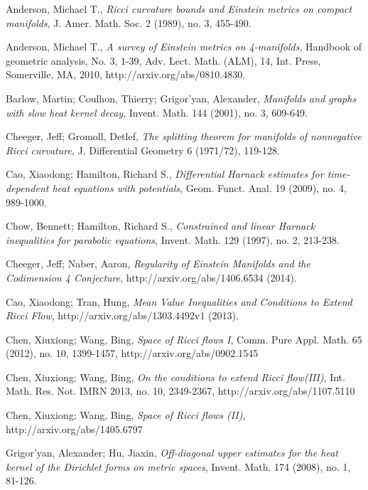 \documentclass[11pt]{amsart}
\numberwithin{equation}{section}
\numberwithin{equation}{section}
\begin{document}
\begin{thebibliography}{00000}
 Anderson, Michael T., {\it Ricci curvature bounds and Einstein metrics on compact manifolds}, J. Amer. Math. Soc. 2 (1989), no. 3, 455-490. 

 Anderson, Michael T., {\it A survey of Einstein metrics on 4-manifolds}, Handbook of geometric analysis, No. 3, 1-39, Adv. Lect. Math. (ALM), 14, Int. Press, Somerville, MA, 2010, http://arxiv.org/abs/0810.4830. 

 Barlow, Martin; Coulhon, Thierry; Grigor'yan, Alexander,
{\it Manifolds and graphs with slow heat kernel decay}, Invent. Math. 144 (2001), no. 3, 609-649.

 Cheeger, Jeff; Gromoll, Detlef,
{\it The splitting theorem for manifolds of nonnegative Ricci curvature}, 
J. Differential Geometry 6 (1971/72), 119-128. 

 Cao, Xiaodong; Hamilton, Richard S., {\it Differential Harnack estimates for time-dependent heat equations with potentials},  Geom. Funct. Anal. 19 (2009), no. 4, 989-1000.

 Chow, Bennett; Hamilton, Richard S., {\it Constrained and linear Harnack inequalities for parabolic equations}, Invent. Math. 129 (1997), no. 2, 213-238.

 Cheeger, Jeff; Naber, Aaron, {\it Regularity of Einstein Manifolds and the Codimension 4 Conjecture}, http://arxiv.org/abs/1406.6534 (2014).

 Cao, Xiaodong; Tran, Hung, {\it Mean Value Inequalities and Conditions to Extend Ricci Flow}, http://arxiv.org/abs/1303.4492v1 (2013).

Chen, Xiuxiong; Wang, Bing, {\it Space of Ricci flows I},
Comm. Pure Appl. Math. 65 (2012), no. 10, 1399-1457, http://arxiv.org/abs/0902.1545

 Chen, Xiuxiong; Wang, Bing, {\it On the conditions to extend Ricci flow(III)},
Int. Math. Res. Not. IMRN 2013, no. 10, 2349-2367, http://arxiv.org/abs/1107.5110

 Chen, Xiuxiong; Wang, Bing, {\it Space of Ricci flows (II)}, http://arxiv.org/abs/1405.6797

 Grigor'yan, Alexander; Hu, Jiaxin, {\it Off-diagonal upper estimates for the heat kernel of the Dirichlet forms on metric spaces}, Invent. Math. 174 (2008), no. 1, 81-126.


\end{thebibliography}
\end{document}

